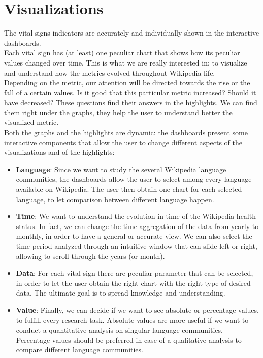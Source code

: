 \section{Visualizations}
\label{sec:product}
The vital signs indicators are accurately and individually shown in the interactive dashboards. \\
Each vital sign has (at least) one peculiar chart that shows how its peculiar values changed over time. This is what we are really interested in: to visualize and understand how the metrics evolved throughout Wikipedia life. \\
Depending on the metric, our attention will be directed towards the rise or the fall of a certain values. Is it good that this particular metric increased? Should it have decreased? These questions find their answers in the highlights. We can find them right under the graphs, they help the user to understand better the visualized metric.\\
Both the graphs and the highlights are dynamic: the dashboards present some interactive components that allow the user to change different aspects of the visualizations and of the highlights:
\begin{itemize}
    \item \textbf{Language}: Since we want to study the several Wikipedia language communities, the dashboards allow the user to select among every language available on Wikipedia. The user then obtain one chart for each selected language, to let comparison between different language happen.
    \item\textbf{Time}: We want to understand the evolution in time of the Wikipedia health status. In fact, we can change the time aggregation of the data from yearly to monthly, in order to have a general or accurate view. We can also select the time period analyzed through an intuitive window that can slide left or right, allowing to scroll through the years (or month).
    \item\textbf{Data}: For each vital sign there are peculiar parameter that can be selected, in order to let the user obtain the right chart with the right type of desired data. The ultimate goal is to spread knowledge and understanding.
    \item\textbf{Value}: Finally, we can decide if we want to see absolute or percentage values, to fulfill every research task.
    Absolute values are more useful if we want to conduct a quantitative analysis on singular language communities.\\
    Percentage values should be preferred in case of a qualitative analysis to compare different language communities.\\
\end{itemize}
